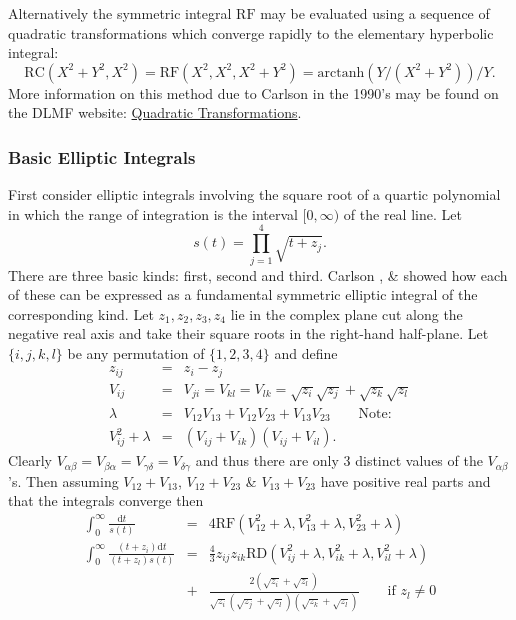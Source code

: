 Alternatively the symmetric integral $\mathrm{RF}$ may be evaluated
using a sequence of quadratic transformations
which converge rapidly to the elementary hyperbolic integral:
\[\mathrm{RC}(X^2+Y^2,X^2) = \mathrm{RF}(X^2,X^2,X^2+Y^2) = \mathrm{arctanh}
(Y/(X^2+Y^2))/Y.\]
More information on this method due to Carlson in the 1990's
may be found on the DLMF website:
\href{https://dlmf.nist.gov/19.36#ii}{Quadratic Transformations}.

\subsubsection{Basic Elliptic Integrals}
First consider elliptic integrals involving the square root of a
quartic polynomial in which the range of integration is the interval
$[0,\infty)$ of the real line. Let
\[s(t)=\prod_{j=1}^4\sqrt{t+z_j}.\]
There are three basic kinds: first, second and third. Carlson \cite{Carlson:88},
\cite{Carlson:99} \& \cite{CarlsonFitzSimmons:00} showed how each of these can be
expressed as a fundamental symmetric elliptic integral of the corresponding
kind. Let $z_1, z_2, z_3, z_4$ lie in the complex plane cut along the negative
real axis and take their square roots in the right-hand half-plane.
Let $\{i,j,k,l\}$ be any permutation  of $\{1,2,3,4\}$ and define
\begin{eqnarray*}
  z_{ij}&=&z_i-z_j\\
  V_{ij}&=&V_{ji}=V_{kl}=V_{lk}= \sqrt{z_i}\sqrt{z_j}+\sqrt{z_k}\sqrt{z_l}\\
  \lambda&=&V_{12}V_{13}+V_{12}V_{23}+V_{13}V_{23}\qquad\mbox{Note:}\\
  V_{ij}^2 +\lambda &=& (V_{ij}+V_{ik})(V_{ij}+V_{il}).
\end{eqnarray*}
Clearly $V_{\alpha\beta}=V_{\beta\alpha}=V_{\gamma\delta}=V_{\delta\gamma}$ and thus there
are only 3 distinct values of the $V_{\alpha\beta}$'s. Then assuming
$V_{12}+V_{13}$, $V_{12}+V_{23}$ \& $V_{13}+V_{23}$ have positive real
parts and that the integrals converge then
\begin{eqnarray*}
\int_0^\infty \frac{\mathrm{d}t}{s(t)} &=& 4\mathrm{RF}(V_{12}^2+\lambda,
V_{13}^2+\lambda, V_{23}^2+\lambda)\\
\int_0^\infty \frac{(t+z_i)\mathrm{d}t}{(t+z_l)s(t)} &=&
\frac{4}{3}z_{ij}z_{ik}\mathrm{RD}(V_{ij}^2+\lambda, V_{ik}^2+\lambda, V_{il}^2+\lambda) \\
&+&\frac{2(\sqrt{z_i}+\sqrt{z_l})}{\sqrt{z_i}(\sqrt{z_j}+\sqrt{z_l})(\sqrt{z_k}+\sqrt{z_l})}\qquad
\mbox{if }z_l\neq 0
\end{eqnarray*}

